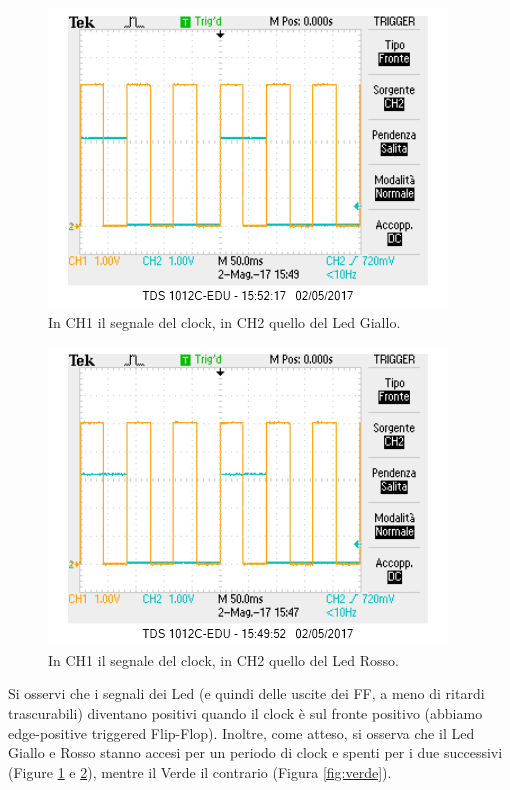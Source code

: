 \documentclass[10pt,a4paper]{article}
\begin{document}
\begin{figure}[!htb]
\centering
\includegraphics[scale=0.7]{clock-gialloverde.png}
\caption{In CH1 il segnale del clock, in CH2 quello del Led Giallo.\label{fig:giallo}}
\end{figure}

\begin{figure}[!htb]
\centering
\includegraphics[scale=0.7]{clock-rosso.png}
\caption{In CH1 il segnale del clock, in CH2 quello del Led Rosso.\label{fig:rosso}}
\end{figure}
Si osservi che i segnali dei Led (e quindi delle uscite dei FF, a meno di ritardi trascurabili) diventano positivi quando il clock è sul fronte positivo (abbiamo edge-positive triggered Flip-Flop).
Inoltre, come atteso, si osserva che il Led Giallo e Rosso stanno accesi per un periodo di clock e spenti per i due successivi (Figure \ref{fig:giallo} e \ref{fig:rosso}), mentre il Verde il contrario (Figura \ref{fig:verde}).
\end{document}
